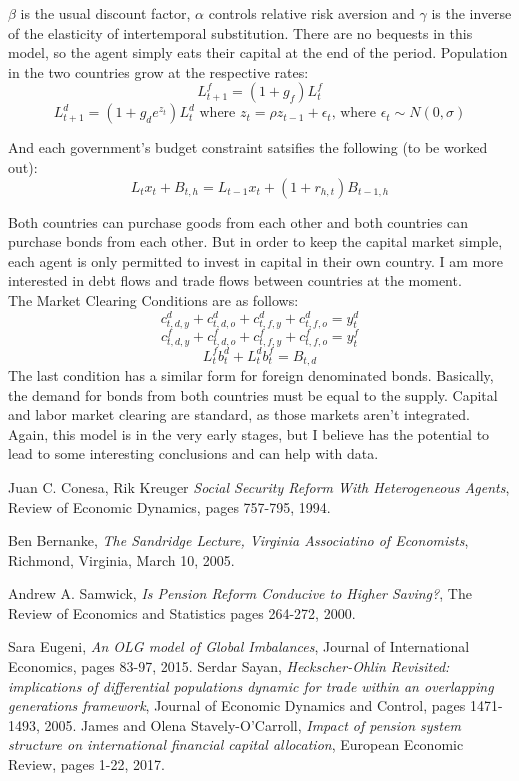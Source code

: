 \documentclass[dvips,12pt]{article}
\begin{document}
$\beta$ is the usual discount factor, $\alpha$ controls relative risk aversion and $\gamma$ is the inverse of the elasticity of intertemporal substitution. There are no bequests in this model, so the agent simply eats their capital at the end of the period.
Population in the two countries grow at the respective rates:
\[L^f_{t+1}=(1+g_f)L^f_t\]
\[L^d_{t+1}=(1+g_d e^{z_t})L^d_t \text{ where } z_t=\rho z_{t-1} + \epsilon_t \text{, where } \epsilon_t \sim N(0,\sigma)\]

And each government's budget constraint satsifies the following (to be worked out):
\[L_t x_t + B_{t,h} = L_{t-1} x_{t} + (1+r_{h,t}) B_{t-1,h}\]

Both countries can purchase goods from each other and both countries can purchase bonds from each other. But in order to keep the capital market simple, each agent is only permitted to invest in capital in their own country. I am more interested in debt flows and trade flows between countries at the moment.\\
The Market Clearing Conditions are as follows:
\[c_{t,d,y}^d+c_{t,d,o}^d+c_{t,f,y}^d+c_{t,f,o}^d=y^d_t\]
\[c_{t,d,y}^f+c_{t,d,o}^f+c_{t,f,y}^f+c_{t,f,o}^f=y^f_t\]
\[L^f_t b^d_t + L^d_t b^f_t = B_{t,d}\] 
The last condition has a similar form for foreign denominated bonds. Basically, the demand for bonds from both countries must be equal to the supply. Capital and labor market clearing are standard, as those markets aren't integrated.
Again, this model is in the very early stages, but I believe has the potential to lead to some interesting conclusions and can help with data.


\begin{thebibliography}{99}

  Juan C. Conesa, Rik Kreuger
  \textit{Social Security Reform With Heterogeneous Agents},
  Review of Economic Dynamics,
  pages 757-795,
  1994.

  Ben Bernanke,
  \textit{The Sandridge Lecture, Virginia Associatino of Economists},
  Richmond, Virginia,
  March 10, 2005.

  Andrew A. Samwick,
  \textit{Is Pension Reform Conducive to Higher Saving?},
  The Review of Economics and Statistics
  pages 264-272,
  2000.

  Sara Eugeni,
  \textit{An OLG model of Global Imbalances},
  Journal of International Economics,
  pages 83-97,
  2015.
  Serdar Sayan,
  \textit{Heckscher-Ohlin Revisited: implications of differential populations dynamic for trade within an overlapping generations framework},
  Journal of Economic Dynamics and Control,
  pages 1471-1493,
  2005.
  James and Olena Stavely-O'Carroll,
  \textit{Impact of pension system structure on international financial capital allocation},
  European Economic Review,
  pages 1-22,
  2017.

\end{thebibliography}
\end{document}
